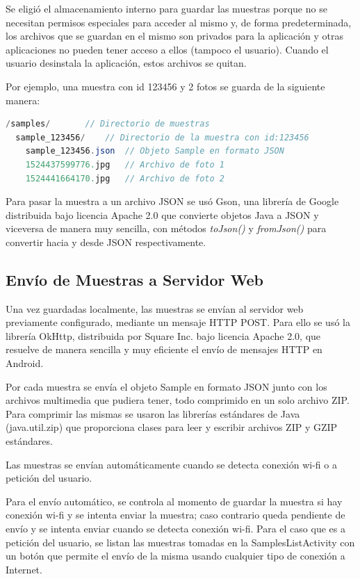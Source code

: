 Se eligió el almacenamiento interno para guardar las muestras porque no se necesitan permisos especiales para acceder al mismo y, de forma predeterminada, los archivos que se guardan en el mismo son privados para la aplicación y otras aplicaciones no pueden tener acceso a ellos (tampoco el usuario). Cuando el usuario desinstala la aplicación, estos archivos se quitan\cite{androidInternalStorage}.

Por ejemplo, una muestra con id 123456 y 2 fotos se guarda de la siguiente manera:
\begin{lstlisting}[language=Java, frame=tlb]
/samples/		// Directorio de muestras
  sample_123456/	// Directorio de la muestra con id:123456 
    sample_123456.json	// Objeto Sample en formato JSON
    1524437599776.jpg	// Archivo de foto 1
    1524441664170.jpg	// Archivo de foto 2
\end{lstlisting}

Para pasar la muestra a un archivo JSON se usó Gson\cite{gson}, una librería de Google distribuida bajo licencia Apache 2.0 que convierte objetos Java a JSON y viceversa de manera muy sencilla, con métodos \textit{toJson()} y \textit{fromJson()} para convertir hacia y desde JSON respectivamente.

\subsection{Envío de Muestras a Servidor Web}

Una vez guardadas localmente, las muestras se envían al servidor web previamente configurado, mediante un mensaje HTTP POST. Para ello se usó la librería OkHttp\cite{okhttp}, distribuida por Square Inc. bajo licencia Apache 2.0, que resuelve de manera sencilla y muy eficiente el envío de mensajes HTTP en Android.

Por cada muestra se envía el objeto Sample en formato JSON junto con los archivos multimedia que pudiera tener, todo comprimido en un solo archivo ZIP. Para comprimir las mismas se usaron las librerías estándares de Java (java.util.zip) que proporciona clases para leer y escribir archivos ZIP y GZIP estándares.

Las muestras se envían automáticamente cuando se detecta conexión wi-fi o a petición del usuario.

Para el envío automático, se controla al momento de guardar la muestra si hay conexión wi-fi y se intenta enviar la muestra; caso contrario queda pendiente de envío y se intenta enviar cuando se detecta conexión wi-fi. Para el caso que es a petición del usuario, se listan las muestras tomadas en la SamplesListActivity con un botón que permite el envío de la misma usando cualquier tipo de conexión a Internet.

